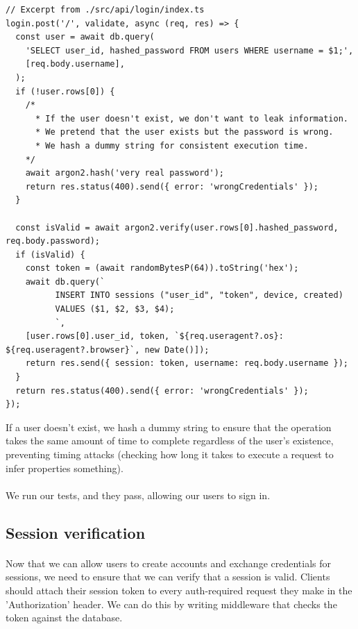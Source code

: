 \documentclass{report}
\begin{document}
\begin{verbatim}
// Excerpt from ./src/api/login/index.ts
login.post('/', validate, async (req, res) => {
  const user = await db.query(
    'SELECT user_id, hashed_password FROM users WHERE username = $1;',
    [req.body.username],
  );
  if (!user.rows[0]) {
    /*
      * If the user doesn't exist, we don't want to leak information.
      * We pretend that the user exists but the password is wrong.
      * We hash a dummy string for consistent execution time.
    */
    await argon2.hash('very real password');
    return res.status(400).send({ error: 'wrongCredentials' });
  }

  const isValid = await argon2.verify(user.rows[0].hashed_password, req.body.password);
  if (isValid) {
    const token = (await randomBytesP(64)).toString('hex');
    await db.query(`
          INSERT INTO sessions ("user_id", "token", device, created)
          VALUES ($1, $2, $3, $4);
          `,
    [user.rows[0].user_id, token, `${req.useragent?.os}: ${req.useragent?.browser}`, new Date()]);
    return res.send({ session: token, username: req.body.username });
  }
  return res.status(400).send({ error: 'wrongCredentials' });
});
\end{verbatim}

If a user doesn't exist, we hash a dummy string to ensure that the operation takes the same amount of time to complete regardless of the user's existence, preventing timing attacks (checking how long it takes to execute a request to infer properties something). 

\paragraph{}
We run our tests, and they pass, allowing our users to sign in.

\subsection{Session verification}
\paragraph{}
Now that we can allow users to create accounts and exchange credentials for sessions, we need to ensure that we can verify that a session is valid. Clients should attach their session token to every auth-required request they make in the 'Authorization' header. We can do this by writing middleware that checks the token against the database.
\end{document}
